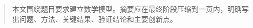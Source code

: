 \documentclass[withoutpreface,bwprint]{cumcmthesis}
\begin{document}
\maketitle

\begin{abstract}
本文围绕题目要求建立数学模型。摘要应在最终阶段压缩到一页内，明确写出问题、方法、关键结果、验证结论和主要创新点。

\end{abstract}











\end{document}
